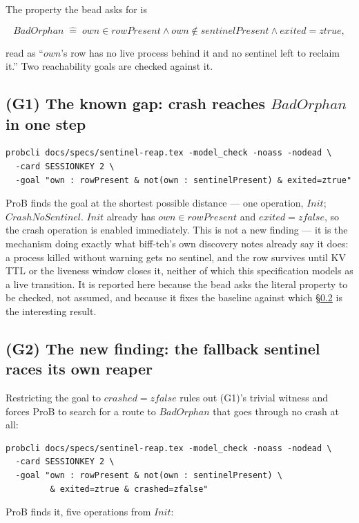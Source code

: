 \documentclass[a4paper,10pt,fleqn]{article}
\begin{document}
The property the bead asks for is

$$BadOrphan \;\widehat{=}\; own \in rowPresent \land own \notin sentinelPresent
\land exited = ztrue,$$

read as ``$own$'s row has no live process behind it and no sentinel
left to reclaim it.''  Two reachability goals are checked against it.

\subsection{(G1) The known gap: crash reaches $BadOrphan$ in one step}
\label{sec:crash-goal}

\begin{verbatim}
probcli docs/specs/sentinel-reap.tex -model_check -noass -nodead \
  -card SESSIONKEY 2 \
  -goal "own : rowPresent & not(own : sentinelPresent) & exited=ztrue"
\end{verbatim}

ProB finds the goal at the shortest possible distance --- one
operation, $Init$; $CrashNoSentinel$.  $Init$ already has $own \in
rowPresent$ and
$exited = zfalse$, so the crash operation is enabled immediately.  This
is not a new finding --- it is the mechanism doing exactly what
biff-teh's own discovery notes already say it does: a process killed
without warning gets no sentinel, and the row survives until KV TTL or
the liveness window closes it, neither of which this specification
models as a live transition.  It is reported here because the bead asks
the literal property to be checked, not assumed, and because it fixes
the baseline against which \S\ref{sec:race} is the interesting result.

\subsection{(G2) The new finding: the fallback sentinel races its own reaper}
\label{sec:race}

Restricting the goal to $crashed = zfalse$ rules out (G1)'s trivial
witness and forces ProB to search for a route to $BadOrphan$ that goes
through no crash at all:

\begin{verbatim}
probcli docs/specs/sentinel-reap.tex -model_check -noass -nodead \
  -card SESSIONKEY 2 \
  -goal "own : rowPresent & not(own : sentinelPresent) \
         & exited=ztrue & crashed=zfalse"
\end{verbatim}

ProB finds it, five operations from $Init$:
\end{document}
